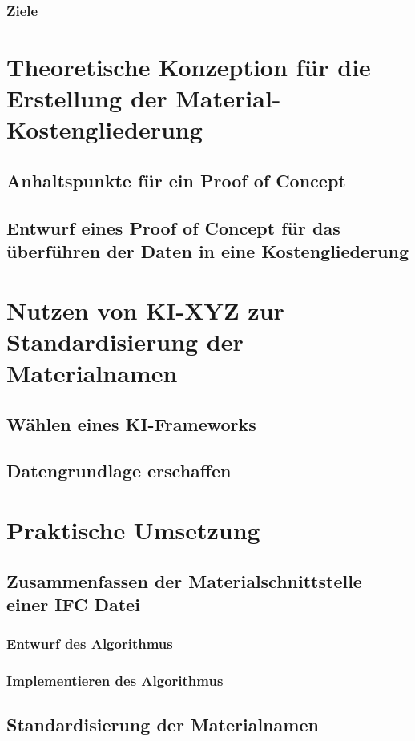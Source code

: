 \subsubsection{Ziele}

\section{Theoretische Konzeption für die Erstellung der Material-Kostengliederung}
\subsection{Anhaltspunkte für ein Proof of Concept}
\subsection{Entwurf eines Proof of Concept für das überführen der Daten in eine Kostengliederung}

\section{Nutzen von KI-XYZ zur Standardisierung der Materialnamen}
\subsection{Wählen eines KI-Frameworks}
\subsection{Datengrundlage erschaffen}
\section{Praktische Umsetzung}

\subsection{Zusammenfassen der Materialschnittstelle einer IFC Datei}
\subsubsection{Entwurf des Algorithmus}
\subsubsection{Implementieren des Algorithmus}

\subsection{Standardisierung der Materialnamen}
